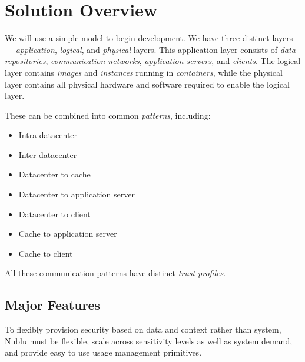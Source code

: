 \documentclass[12pt,letterpaper]{article}
\begin{document}
\section{Solution Overview}
\label{sec:overview}
We will use a simple model to begin development.  We have three distinct layers --- {\sl application}, {\sl logical}, and {\sl physical} layers. This application layer consists of {\sl data repositories}, {\sl communication networks}, {\sl application servers}, and {\sl clients}.  The logical layer contains {\sl images} and {\sl instances} running in {\sl containers}, while the physical layer contains all physical hardware and software required to enable the logical layer.

These can be combined into common {\sl patterns}, including:
\begin{itemize}
\item Intra-datacenter
\item Inter-datacenter
\item Datacenter to cache
\item Datacenter to application server
\item Datacenter to client
\item Cache to application server
\item Cache to client
\end{itemize}
All these communication patterns have distinct {\sl trust profiles}.

\subsection{Major Features}
\label{sec:features}
To flexibly provision security based on data and context rather than system, Nublu must be flexible, scale across sensitivity levels as well as system demand, and provide easy to use usage management primitives.
\end{document}
